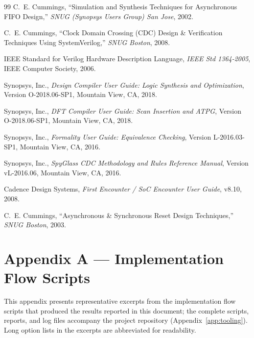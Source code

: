 \documentclass[11pt,a4paper]{article}
\begin{document}
\begin{thebibliography}{99}
C.~E. Cummings, ``Simulation and Synthesis Techniques for Asynchronous FIFO Design,'' \emph{SNUG (Synopsys Users Group) San Jose}, 2002.

C.~E. Cummings, ``Clock Domain Crossing (CDC) Design \& Verification Techniques Using SystemVerilog,'' \emph{SNUG Boston}, 2008.

IEEE Standard for Verilog Hardware Description Language, \emph{IEEE Std 1364-2005}, IEEE Computer Society, 2006.

Synopsys, Inc., \emph{Design Compiler User Guide: Logic Synthesis and Optimization}, Version O-2018.06-SP1, Mountain View, CA, 2018.

Synopsys, Inc., \emph{DFT Compiler User Guide: Scan Insertion and ATPG}, Version O-2018.06-SP1, Mountain View, CA, 2018.

Synopsys, Inc., \emph{Formality User Guide: Equivalence Checking}, Version L-2016.03-SP1, Mountain View, CA, 2016.

Synopsys, Inc., \emph{SpyGlass CDC Methodology and Rules Reference Manual}, Version vL-2016.06, Mountain View, CA, 2016.

Cadence Design Systems, \emph{First Encounter / SoC Encounter User Guide}, v8.10, 2008.

C.~E. Cummings, ``Asynchronous \& Synchronous Reset Design Techniques,'' \emph{SNUG Boston}, 2003.
\end{thebibliography}
\newpage
{}
\makeatletter{}\makeatother
{}
\label{app:flow}
\section*{Appendix A --- Implementation Flow Scripts}

This appendix presents representative excerpts from the implementation flow scripts that produced the results reported in this document; the complete scripts, reports, and log files accompany the project repository (Appendix~\ref{app:tooling}). Long option lists in the excerpts are abbreviated for readability.
\end{document}
